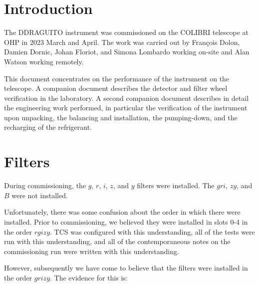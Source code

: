 \documentclass{article}
\begin{document}

\clearpage

\pagestyle{plain}

\setcounter{tocdepth}{2}
\tableofcontents
\clearpage




\section{Introduction}

The DDRAGUITO instrument was commissioned on the COLIBRI telescope at OHP in 2023 March and April. The work was carried out by François Dolon, Damien Dornic, Johan Floriot, and Simona Lombardo working on-site and Alan Watson working remotely.

This document concentrates on the performance of the instrument on the telescope. A companion document \cite{laboratory} describes the detector and filter wheel verification in the laboratory. A second companion document \cite{dolon} describes in detail the engineering work performed, in particular the verification of the instrument upon unpacking, the balancing and installation, the pumping-down, and the recharging of the refrigerant.

\section{Filters}

During commissioning, the $g$, $r$, $i$, $z$, and $y$ filters were installed. The $gri$, $zy$, and $B$ were not installed.

Unfortunately, there was some confusion about the order in which there were installed. Prior to commissioning, we believed they were installed in slots 0-4 in the order $rgizy$. TCS was configured with this understanding, all of the tests were run with this understanding, and all of the contemporaneous notes on the commissioning run were written with this understanding.

However, subsequently we have come to believe that the filters were installed in the order $grizy$. The evidence for this is:
\end{document}
